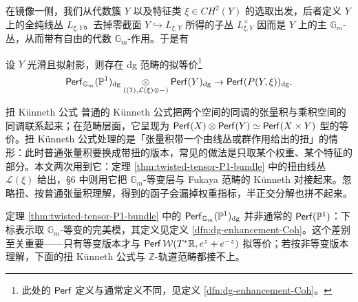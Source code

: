 在镜像一侧，我们从代数簇 $Y$ 以及特征类 $\xi\in CH^2 (Y)$ 的选取出发，后者定义 $Y$ 上的全纯线丛 $L_{\xi, Y}$。去掉零截面 $Y\hookrightarrow L_{\xi, Y}$ 所得的子丛 $L_{\xi,Y}^{\times}$ 因而是 $Y$ 上的主 $\mathbb{G}_m$-丛，从而带有自由的代数 $\mathbb{G}_m$-作用。于是有

\begin{thm}\label{thm:twisted-tensor-P1-bundle}
    设 $Y$ 光滑且拟射影，则存在 dg 范畴的拟等价\footnote{此处的 $\operatorname{\mathsf{Perf}}$ 定义与通常定义不同，见定义 \ref{dfn:dg-enhancement-Coh}。}
\[
\operatorname{\mathsf{Perf}}_{\mathbb{G}_m}(\mathbb{P}^1)_{\operatorname{\operatorname{dg}}}
\underset{((1),\mathcal{L}(\xi)\otimes-)}{\otimes}
\operatorname{\mathsf{Perf}}(Y)_{\operatorname{\operatorname{dg}}}
\rightarrow
\operatorname{\mathsf{Perf}}(P(Y,\xi))_{\operatorname{\operatorname{dg}}}.
\]
\end{thm}

\begin{conceptbox}{扭 Künneth 公式}
普通的 Künneth 公式把两个空间的同调的张量积与乘积空间的同调联系起来；在范畴层面，它呈现为 $\operatorname{\mathsf{Perf}} (X)\otimes\operatorname{\mathsf{Perf}} (Y)\simeq\operatorname{\mathsf{Perf}} (X\times Y)$ 型的等价。扭 Künneth 公式处理的是「张量积带一个由线丛或群作用给出的扭」的情形：此时普通张量积要换成带扭的版本，常见的做法是只取某个权重、某个特征的部分。本文两次用到它：定理 \ref{thm:twisted-tensor-P1-bundle} 中的扭由线丛 $\mathcal{L} (\xi)$ 给出，§6 中则用它把 $\mathbb{G}_m$-等变层与 Fukaya 范畴的 Künneth 对接起来。忽略扭、按普通张量积理解，得到的函子会漏掉权重指标，半正交分解也拼不起来。
\par\smallskip{}
\end{conceptbox}

\begin{yizhu}
定理 \ref{thm:twisted-tensor-P1-bundle} 中的 $\operatorname{\mathsf{Perf}}_{\mathbb{G}_m}(\mathbb{P}^1)_{\operatorname{\operatorname{dg}}}$ 并非通常的 $\operatorname{\mathsf{Perf}}(\mathbb{P}^1)$：下标表示取 $\mathbb{G}_m$-等变的完美模，其定义见定义 \ref{dfn:dg-enhancement-Coh}。这个差别至关重要——只有等变版本才与 $\operatorname{\mathsf{Perf}}\mathcal{W}(T^{\ast}\mathbb{R},e^z+e^{-z})$ 拟等价；若按非等变版本理解，下面的扭 Künneth 公式与 $\mathbb{Z}$-轨道范畴都接不上。
\end{yizhu}

